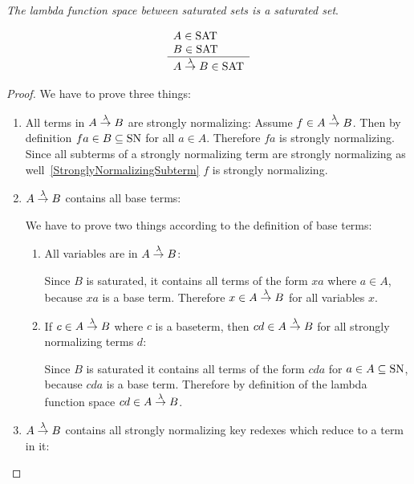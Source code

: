 \begin{theorem}
    \label{LambdaSpaceSaturated}
    \emph{The lambda function space between saturated sets is a saturated set}.

    $$
    \begin{array}{l} 
        A \in \text{SAT}
        \\
        B \in \text{SAT}
     \\ \hline 
        A \stackrel{\lambda}{\to} B \in \text{SAT}
    \end{array}
    $$

    \begin{proof}
        We have to prove three things:
        \begin{enumerate}
        \item All terms in $A \stackrel{\lambda}{\to} B$ are strongly normalizing: Assume $f
            \in A \stackrel{\lambda}{\to} B$. Then by definition $fa \in B \subseteq \text{SN}$ for
                all $a \in A$. Therefore $fa$ is strongly normalizing. Since all
                subterms of a strongly normalizing term are strongly normalizing
                as well~\ref{StronglyNormalizingSubterm} $f$ is strongly
                normalizing.

        \item $A \stackrel{\lambda}{\to} B$ contains all base terms:

            We have to prove two things according to the definition of base
            terms:

            \begin{enumerate}
            \item All variables are in $A \stackrel{\lambda}{\to} B$:

                Since $B$ is saturated, it contains all terms of the form $xa$
                where $a \in A$, because $xa$ is a base term. Therefore $x
                \in A \stackrel{\lambda}{\to} B$ for all variables $x$.

            \item If $c \in A \stackrel{\lambda}{\to} B$ where $c$ is a baseterm, then $cd
                \in A \stackrel{\lambda}{\to} B$ for all strongly normalizing terms $d$:

                Since $B$ is saturated it contains all terms of the form $cda$
                for $a \in A \subseteq \text{SN}$, because $cda$ is a base term.
                Therefore by definition of the lambda function space $cd \in
                A \stackrel{\lambda}{\to} B$.
            \end{enumerate}

        \item $A \stackrel{\lambda}{\to} B$ contains all strongly normalizing key redexes
            which reduce to a term in it:


\end{enumerate}
\end{proof}
\end{theorem}
